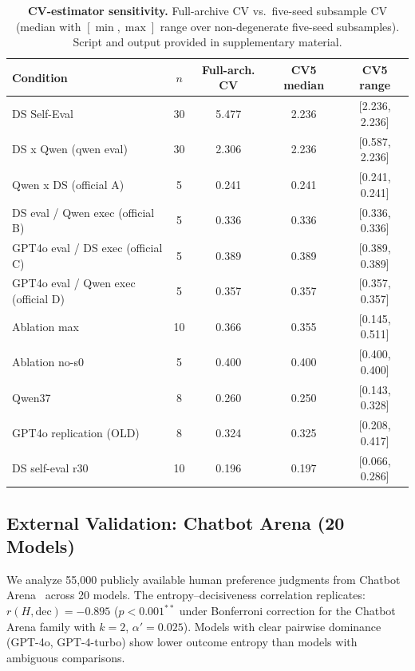 \documentclass[11pt]{article}
\begin{document}
\begin{table}[t]
\centering
\caption{\textbf{CV-estimator sensitivity.} Full-archive CV vs.\ five-seed subsample CV (median with $[\min,\max]$ range over non-degenerate five-seed subsamples). Script and output provided in supplementary material.}
\label{tab:cv-sens}
\small
\setlength{\tabcolsep}{2pt}
\begin{tabular}{@{}lcccc@{}}
\toprule
Condition & $n$ & Full-arch. CV & CV5 median & CV5 range \\
\midrule
DS Self-Eval & 30 & 5.477 & 2.236 & [2.236, 2.236] \\
DS x Qwen (qwen eval) & 30 & 2.306 & 2.236 & [0.587, 2.236] \\
Qwen x DS (official A) & 5 & 0.241 & 0.241 & [0.241, 0.241] \\
DS eval / Qwen exec (official B) & 5 & 0.336 & 0.336 & [0.336, 0.336] \\
GPT4o eval / DS exec (official C) & 5 & 0.389 & 0.389 & [0.389, 0.389] \\
GPT4o eval / Qwen exec (official D) & 5 & 0.357 & 0.357 & [0.357, 0.357] \\
Ablation max & 10 & 0.366 & 0.355 & [0.145, 0.511] \\
Ablation no-s0 & 5 & 0.400 & 0.400 & [0.400, 0.400] \\
Qwen37 & 8 & 0.260 & 0.250 & [0.143, 0.328] \\
GPT4o replication (OLD) & 8 & 0.324 & 0.325 & [0.208, 0.417] \\
DS self-eval r30 & 10 & 0.196 & 0.197 & [0.066, 0.286] \\
\bottomrule
\end{tabular}
\end{table}



\subsection{External Validation: Chatbot Arena (20 Models)}

We analyze 55,000 publicly available human preference judgments from Chatbot Arena~\cite{chiang2024chatbot} across 20 models. The entropy--decisiveness correlation replicates: $r(H, \text{dec}) = -0.895$ ($p < 0.001^{**}$ under Bonferroni correction for the Chatbot Arena family with $k = 2$, $\alpha' = 0.025$). Models with clear pairwise dominance (GPT-4o, GPT-4-turbo) show lower outcome entropy than models with ambiguous comparisons.
\end{document}
